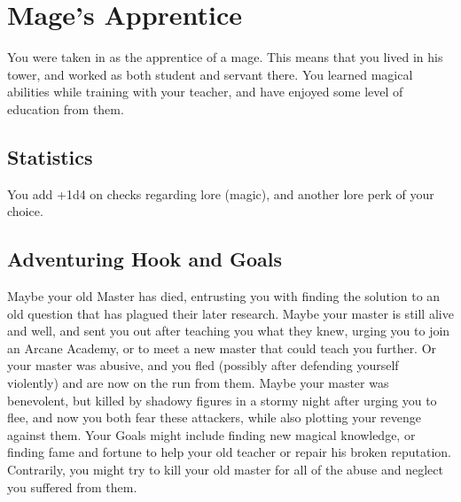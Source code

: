 \section{Mage's Apprentice}\label{background:mageApprentice}
You were taken in as the apprentice of a mage.
This means that you lived in his tower, and worked as both student and servant there.
You learned magical abilities while training with your teacher, and have enjoyed some level of education from them.

\subsection{Statistics}
You add +1d4 on checks regarding lore (magic), and another lore perk of your choice.

\subsection{Adventuring Hook and Goals}
Maybe your old Master has died, entrusting you with finding the solution to an old question that has plagued their later research.
Maybe your master is still alive and well, and sent you out after teaching you what they knew, urging you to join an Arcane Academy, or to meet a new master that could teach you further.
Or your master was abusive, and you fled (possibly after defending yourself violently) and are now on the run from them.
Maybe your master was benevolent, but killed by shadowy figures in a stormy night after urging you to flee, and now you both fear these attackers, while also plotting your revenge against them.
Your Goals might include finding new magical knowledge, or finding fame and fortune to help your old teacher or repair his broken reputation.
Contrarily, you might try to kill your old master for all of the abuse and neglect you suffered from them.
